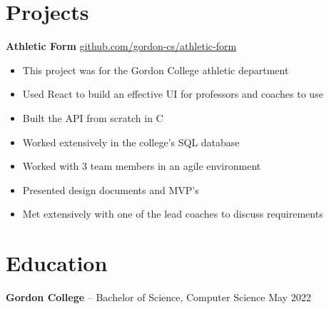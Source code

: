 \documentclass[11pt]{article}       %
\newcommand{\CS}{C\nolinebreak\hspace{-.05em}\raisebox{.6ex}{\scriptsize\bf \#}}
\begin{document}
\vspace{-18.5pt}

\section*{Projects}
\textbf{Athletic Form} \hfill \href{https://github.com/gordon-cs/athletic-form}{github.com/gordon-cs/athletic-form} \\
\vspace{-9pt}
\begin{itemize}
  \item{This project was for the Gordon College athletic department}
  \item{Used React to build an effective UI for professors and coaches to use}
  \item{Built the API from scratch in \CS}
  \item{Worked extensively in the college's SQL database}
  \item{Worked with 3 team members in an agile environment}
  \item{Presented design documents and MVP's}
  \item{Met extensively with one of the lead coaches to discuss requirements}
\end{itemize}


\vspace{-18.5pt}

\section*{Education}
\textbf{Gordon College} -- Bachelor of Science, Computer Science \hfill May 2022
\end{document}
